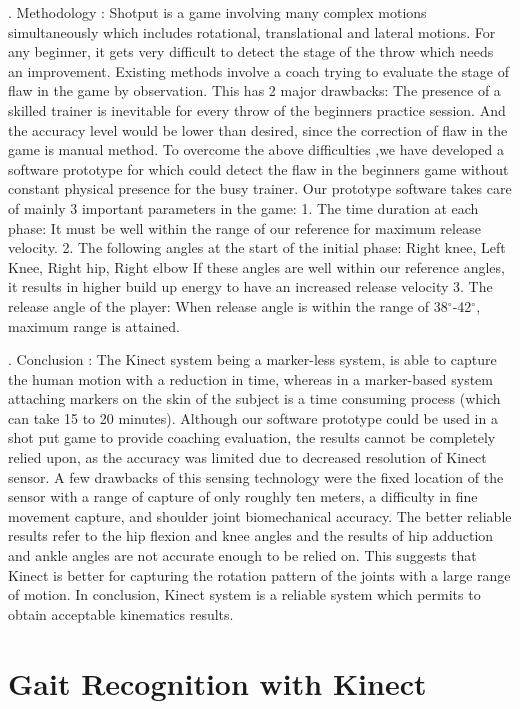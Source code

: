 . Methodology :
\noindent Shotput is a game involving many complex motions simultaneously which includes rotational, translational and lateral motions. For any beginner, it gets very difficult to detect the stage of the throw which needs an improvement. Existing methods involve a coach trying to evaluate the stage of flaw in the game by observation. This has 2 major drawbacks: The presence of a skilled trainer is inevitable for every throw of the beginners practice session. And the accuracy level would be lower than desired, since the correction of flaw in the game is manual method. To overcome the above difficulties ,we have developed a software prototype for which could detect the flaw in the beginners game without constant physical presence for the busy trainer.
Our prototype software takes care of mainly 3 important parameters in the game:
1. The time duration at each phase:
It must be well within the range of our reference  for maximum release velocity.
2. The following angles at the start of the initial phase: Right knee, Left Knee, Right hip, Right elbow
If these angles are well within our reference angles, it results in higher build up energy to
have an increased release velocity
3. The release angle of the player:
When release angle is within the range of 38$^{\circ}$-42$^{\circ}$, maximum range is attained.

. Conclusion :
\noindent The Kinect system being a marker-less system, is able to capture the human motion with a reduction in time, whereas in a marker-based system attaching markers on the skin of the subject is a time consuming process (which can take 15 to 20 minutes). Although our software prototype could be used in a shot put game to provide coaching evaluation, the results cannot be completely relied upon, as the accuracy was limited due to decreased resolution of Kinect sensor. A few drawbacks of this sensing technology were the fixed location of the sensor with a range of capture of only roughly ten meters, a difficulty in fine movement capture, and shoulder joint biomechanical accuracy. The better reliable results refer to the hip flexion and knee angles and the results of hip adduction and ankle angles are not accurate enough to be relied on. This suggests that Kinect is better for capturing the rotation pattern of the joints with a large range of motion. In conclusion, Kinect system is a reliable system which permits to obtain acceptable kinematics results.

\newpage

\section{Gait Recognition with Kinect} \label{Gait Recognition with Kinect}

